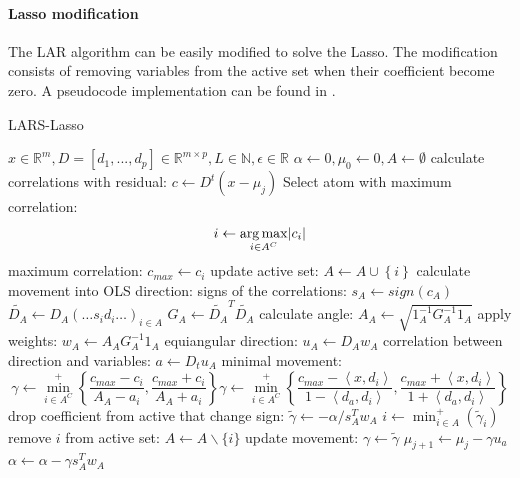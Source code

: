 \paragraph{Lasso modification}
The LAR algorithm can be easily modified to solve the Lasso. 
The modification consists of removing variables from the active set
when their coefficient become zero. A pseudocode implementation can be found in
.
\begin{algorithm}
\caption{LARS-Lasso}
\label{alg:lars}
\begin{algorithmic}[1]
\REQUIRE $x \in \mathbb{R}^m, D =[d_1,...,d_p] \in \mathbb{R}^{m\times p}, L \in
\mathbb{N}, \epsilon \in \mathbb{R}$
\STATE $\alpha \gets 0, \mu_{0} \gets 0, A \gets \emptyset$
\STATE calculate correlations with residual: $c \gets D^t\left( x-\mu_j \right)
$
\STATE Select atom with maximum correlation: 
\begin{equation*}
i \gets \argmax_{i \in A^C} \lvert c_i  \rvert %
\end{equation*}
\STATE maximum correlation: $c_{max} \gets c_i $ %
\STATE update active set: $A \gets A \cup \left\{i\right\} $
\STATE calculate movement into OLS direction:
\STATE signs of the correlations: $s_A \gets  sign\left(c_A\right)$
\STATE $\tilde{D_A} \gets D_A\left(\ldots s_id_i \ldots\right)_{i\in A}$
\STATE $G_A \gets \tilde{D_A}^T\tilde{D_A}$
\STATE calculate angle: $A_A \gets \sqrt{ 1_A^{-1} G_A^{-1} 1_A
}$
\STATE apply weights: $w_A \gets A_AG_A^{-1}1_A$
\STATE equiangular direction: $u_A \gets D_Aw_A$
\STATE correlation between direction and variables: $a \gets D_tu_A$
\STATE minimal movement:
\begin{equation*}
\gamma \gets \min_{i\in A^C}^{+} \left\lbrace \frac{c_{max}-c_i }{A_A-a_i },
\frac{c_{max}+c_i }{A_A+a_i } \right\rbrace
\gamma \gets \min_{i\in A^C}^{+} \left\lbrace \frac{c_{max}-\left< x,d_i
\right> }{1-\left< d_a,d_i \right> }, \frac{c_{max}+\left< x,d_i \right>
}{1+\left< d_a,d_i \right> } \right\rbrace
\end{equation*}
\STATE drop coefficient from active that change sign: 
\STATE $ \tilde{\gamma} \gets -\alpha/s_A^Tw_A  $
\STATE $ i \gets \min_{i\in A}^{+} \left( \tilde{\gamma}_i \right) $
\STATE remove $i$ from active set: $ A \gets A \backslash \{i\} $
\STATE update movement: $ \gamma \gets \tilde{\gamma} $  
\ENDIF
\STATE $ \mu_{j+1} \gets \mu_{j} - \gamma u_a $
\STATE $ \alpha \gets \alpha - \gamma s_A^Tw_A $
\ENDFOR
\end{algorithmic}
\end{algorithm}


